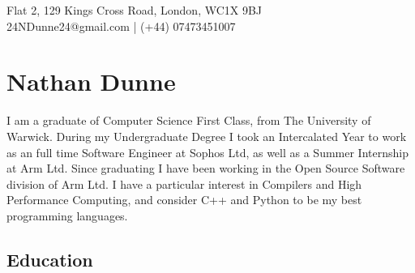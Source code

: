 \documentclass[11pt]{article}
\newcommand{\linesep}{\noindent\makebox[\linewidth]{\rule{\linewidth}{0.2pt}}}
\begin{document}
\hspace*{\fill} Flat 2, 129 Kings Cross Road, London, WC1X 9BJ \\
\hspace*{\fill} 24NDunne24@gmail.com | (+44) 07473451007
\section*{Nathan Dunne}

I am a graduate of Computer Science First Class, from The University of Warwick. During my Undergraduate Degree I took an Intercalated Year to work as an full time Software Engineer at Sophos Ltd, as well as a Summer Internship at Arm Ltd. Since graduating I have been working in the Open Source Software division of Arm Ltd. I have a particular interest in Compilers and High Performance Computing, and consider C++ and Python to be my best programming languages.

\linesep
\subsection*{Education}

\newcommand\result[7]{\node[commit] (#1) {}; 
  \node[llabel] at (#1) {
  #3\\
  \textcolor{darkgray}{#6}\\
  \hspace*{4ex}#7
  };
  \node[rlabel, text width=\textwidth-#2em] at (#1) {#5};
}

\newcommand\subresult[6]{\node[commit] (#1) {}; 
  \node[llabel] at (#1) {
  #3\\
  \hspace*{4ex}#6
  };
  \node[rlabel, text width=\textwidth-#2em] at (#1) {#5};
}
\newcommand\ghost[1]{\coordinate (#1);}
\newcommand\connect[2]{\path (#1) to[out=90,in=-90] (#2);}
\end{document}
